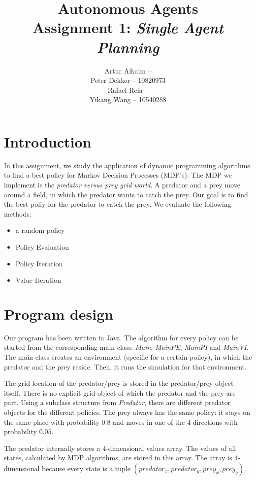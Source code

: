 \documentclass{article}
\begin{document}
\title{Autonomous Agents\\
Assignment 1: \emph{Single Agent Planning}}
\author{
Artur Alkaim --\\
Peter Dekker -- 10820973\\
Rafael Reia --\\
Yikang Wang -- 10540288\\
}
\maketitle
\section{Introduction}
In this assignment, we study the application of dynamic programming algorithms to find a best policy for Markov Decision Processes (MDP's). The MDP we implement is the \emph{predator versus prey grid world}. A predator and a prey move around a field, in which the predator wants to catch the prey. Our goal is to find the best poliy for the predator to catch the prey. We evaluate the following methods:
\begin{itemize}
\item a random policy
\item Policy Evaluation
\item Policy Iteration
\item Value Iteration
\end{itemize}
\section{Program design}
Our program has been written in Java. The algorithm for every policy can be started from the corresponding main class: \emph{Main}, \emph{MainPE}, \emph{MainPI} and \emph{MainVI}. The main class creates an environment (specific for a certain policy), in which the predator and the prey reside. Then, it runs the simulation for that environment. 

The grid location of the predator/prey is stored in the predator/prey object itself. There is no explicit grid object of which the predator and the prey are part. Using a subclass structure from \emph{Predator}, there are different predator objects for the different policies. The prey always has the same policy: it stays on the same place with probability $0.8$ and moves in one of the 4 directions with probability $0.05$.

The predator internally stores a 4-dimensional values array. The values of all states, calculated by MDP algorithms, are stored in this array. The array is 4-dimensional because every state is a tuple $(predator_x,predator_y,prey_x,prey_y)$.
\end{document}

